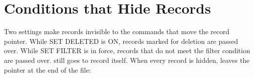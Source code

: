 \section{Conditions that Hide Records}
Two settings make records invisible to the commands that move the record
pointer.  While SET DELETED is ON, records marked for deletion are passed over.
While SET FILTER is in force, records that do not meet the filter condition are
passed over.    still goes to record  itself.  When every
record is hidden,  leaves the pointer at the end of the file:
